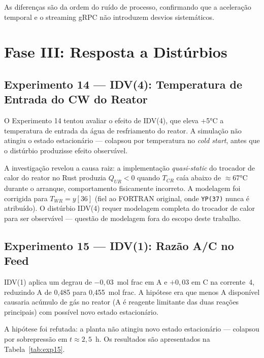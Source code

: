 As diferenças são da ordem do ruído de processo, confirmando que a aceleração temporal e o streaming gRPC não introduzem desvios sistemáticos.

\section{Fase III: Resposta a Distúrbios}
\label{sec:fase3}

\subsection{Experimento 14 — IDV(4): Temperatura de Entrada do CW do Reator}

O Experimento 14 tentou avaliar o efeito de IDV(4), que eleva +5°C a temperatura de entrada da água de resfriamento do reator. A simulação não atingiu o estado estacionário — colapsou por temperatura no \textit{cold start}, antes que o distúrbio produzisse efeito observável.

A investigação revelou a causa raiz: a implementação \textit{quasi-static} do trocador de calor do reator no Rust produzia $Q_{UR} < 0$ quando $T_{CR}$ caía abaixo de $\approx$67°C durante o arranque, comportamento fisicamente incorreto. A modelagem foi corrigida para $T_{WR} = y[36]$ (fiel ao FORTRAN original, onde \texttt{YP(37)} nunca é atribuído). O distúrbio IDV(4) requer modelagem completa do trocador de calor para ser observável — questão de modelagem fora do escopo deste trabalho.

\subsection{Experimento 15 — IDV(1): Razão A/C no Feed}
\label{sec:exp15}

IDV(1) aplica um degrau de $-0{,}03$~mol frac em A e $+0{,}03$ em C na corrente~4, reduzindo A de 0,485 para 0,455~mol frac. A hipótese era que menos A disponível causaria acúmulo de gás no reator (A é reagente limitante das duas reações principais) com possível novo estado estacionário.

A hipótese foi refutada: a planta não atingiu novo estado estacionário — colapsou por sobrepressão em $t \approx 2{,}5$~h. Os resultados são apresentados na Tabela~\ref{tab:exp15}.

